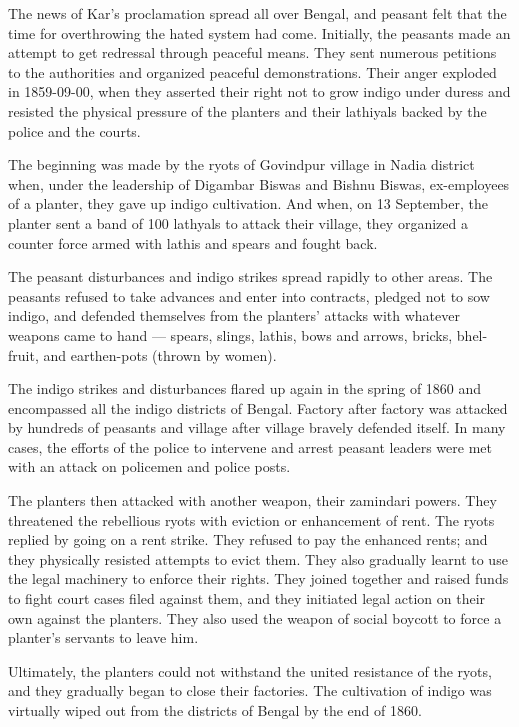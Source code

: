 The news of Kar's proclamation spread all over Bengal, and peasant felt that the time for overthrowing the hated system had come. Initially, the peasants made an attempt to get redressal through peaceful means. They sent numerous petitions to the authorities and organized peaceful demonstrations. Their anger exploded in 1859-09-00, when they asserted their right not to grow indigo under duress and resisted the physical pressure of the planters and their lathiyals backed by the police and the courts.

The beginning was made by the ryots of Govindpur village in Nadia district when, under the leadership of Digambar Biswas and Bishnu Biswas, ex-employees of a planter, they gave up indigo cultivation. And when, on 13 September, the planter sent a band of 100 lathyals to attack their village, they organized a counter force armed with lathis and spears and fought back.

The peasant disturbances and indigo strikes spread rapidly to other areas. The peasants refused to take advances and enter into contracts, pledged not to sow indigo, and defended themselves from the planters' attacks with whatever weapons came to hand — spears, slings, lathis, bows and arrows, bricks, bhel-fruit, and earthen-pots (thrown by women).

The indigo strikes and disturbances flared up again in the spring of 1860 and encompassed all the indigo districts of Bengal. Factory after factory was attacked by hundreds of peasants and village after village bravely defended itself. In many cases, the efforts of the police to intervene and arrest peasant leaders were met with an attack on policemen and police posts.

The planters then attacked with another weapon, their zamindari powers. They threatened the rebellious ryots with eviction or enhancement of rent. The ryots replied by going on a rent strike. They refused to pay the enhanced rents; and they physically resisted attempts to evict them. They also gradually learnt to use the legal machinery to enforce their rights. They joined together and raised funds to fight court cases filed against them, and they initiated legal action on their own against the planters. They also used the weapon of social boycott to force a planter's servants to leave him.

Ultimately, the planters could not withstand the united resistance of the ryots, and they gradually began to close their factories. The cultivation of indigo was virtually wiped out from the districts of Bengal by the end of 1860.

